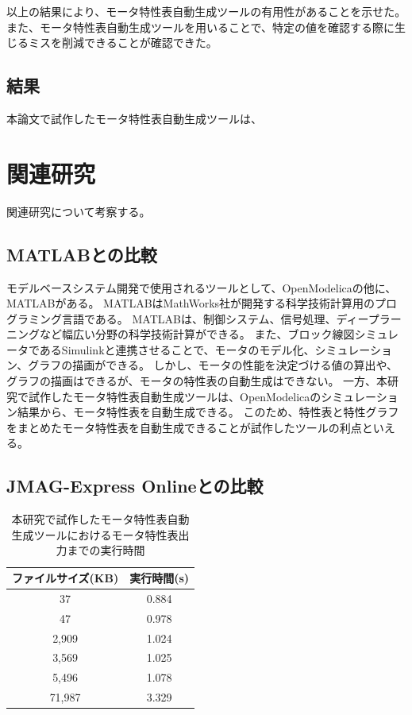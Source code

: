 以上の結果により、モータ特性表自動生成ツールの有用性があることを示せた。また、モータ特性表自動生成ツールを用いることで、特定の値を確認する際に生じるミスを削減できることが確認できた。


\subsection{結果}
本論文で試作したモータ特性表自動生成ツールは、

\section{関連研究}
関連研究について考察する。

\subsection{MATLABとの比較}
モデルベースシステム開発で使用されるツールとして、OpenModelicaの他に、MATLABがある。
MATLABはMathWorks社が開発する科学技術計算用のプログラミング言語である。
MATLABは、制御システム、信号処理、ディープラーニングなど幅広い分野の科学技術計算ができる。
また、ブロック線図シミュレータであるSimulinkと連携させることで、モータのモデル化、シミュレーション、グラフの描画ができる。
しかし、モータの性能を決定づける値の算出や、グラフの描画はできるが、モータの特性表の自動生成はできない。
一方、本研究で試作したモータ特性表自動生成ツールは、OpenModelicaのシミュレーション結果から、モータ特性表を自動生成できる。
このため、特性表と特性グラフをまとめたモータ特性表を自動生成できることが試作したツールの利点といえる。


\subsection{JMAG-Express Onlineとの比較}
\begin{table}[t]
	\centering
	\caption{本研究で試作したモータ特性表自動生成ツールにおけるモータ特性表出力までの実行時間}
	\begin{tabular}{|c|c|} \hline
	  ファイルサイズ(KB) & 実行時間(s)\\ \hline \hline
	  37 & 0.884 \\ \hline
	  47 &  0.978\\ \hline
	  2,909 &  1.024 \\ \hline
	  3,569 & 1.025 \\ \hline
	  5,496 &  1.078\\ \hline
	  71,987 &  3.329 \\ \hline
	\end{tabular}
	\label{tab:executionTime}
  \end{table}

